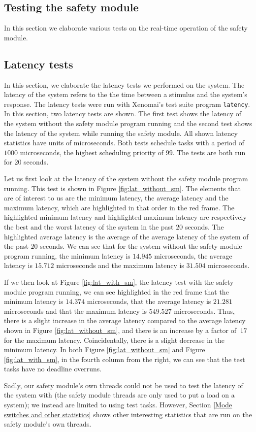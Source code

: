\documentclass[12pt]{scrreprt}
\begin{document}
\subsection{Testing the safety module}
\label{Testing the safety module}
In this section we elaborate various tests on the real-time operation of the safety module.

\subsection{Latency tests}
\label{Latency tests}

In this section, we elaborate the latency tests we performed on the system. The latency of the system refers to the the time between a stimulus and the system's response. The latency tests were run with Xenomai's test suite program \texttt{latency}. In this section, two latency tests are shown. The first test shows the latency of the system without the safety module program running and the second test shows the latency of the system while running the safety module. All shown latency statistics have units of microseconds. Both tests schedule tasks with a period of $1000$ microseconds, the highest scheduling priority of $99$. The tests are both run for $20$ seconds. 
\par
Let us first look at the latency of the system without the safety module program running. This test is shown in Figure \ref{fig:lat_without_sm}. The elements that are of interest to us are the minimum latency, the average latency and the maximum latency, which are highlighted in that order in the red frame. The highlighted minimum latency and highlighted maximum latency are respectively the best and the worst latency of the system in the past $20$ seconds. The highlighted average latency is the average of the average latency of the system of the past $20$ seconds. We can see that for the system without the safety module program running, the minimum latency is $14.945$ microseconds, the average latency is $15.712$ microseconds and the maximum latency is $31.504$ microseconds. 
\par
If we then look at Figure \ref{fig:lat_with_sm}, the latency test with the safety module program running, we can see highlighted in the red frame that the minimum latency is $14.374$ microseconds, that the average latency is $21.281$ microseconds and that the maximum latency is $549.527$ microseconds. Thus, there is a slight increase in the average latency compared to the average latency shown in Figure \ref{fig:lat_without_sm}, and there is an increase by a factor of $~17$ for the maximum latency. Coincidentally, there is a slight decrease in the minimum latency. In both Figure \ref{fig:lat_without_sm} and Figure \ref{fig:lat_with_sm}, in the fourth column from the right, we can see that the test tasks have no deadline overruns.
\par
Sadly, our safety module's own threads could not be used to test the latency of the system with (the safety module threads are only used to put a load on a system); we instead are limited to using test tasks. However, Section \ref{Mode switches and other statistics} shows other interesting statistics that are run on the safety module's own threads.
\end{document}
